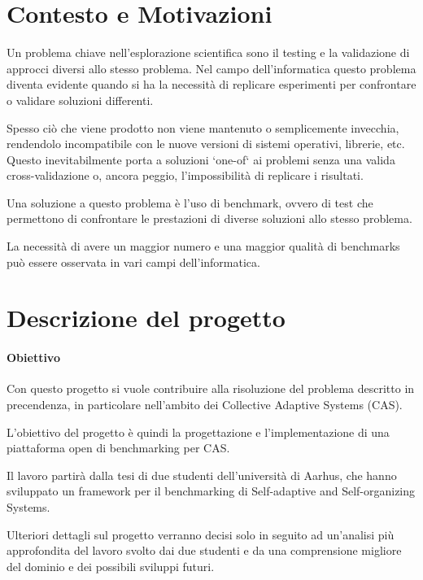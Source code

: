 \documentclass[12pt, a4paper]{article}
\begin{document}


\section{Contesto e Motivazioni} \label{sec:context}

Un problema chiave nell'esplorazione scientifica sono il testing e la validazione di approcci diversi allo stesso 
problema.
Nel campo dell'informatica questo problema diventa evidente quando si ha la necessità di replicare esperimenti
per confrontare o validare soluzioni differenti.

Spesso ciò che viene prodotto non viene mantenuto o semplicemente invecchia, rendendolo incompatibile con le nuove 
versioni di sistemi operativi, librerie, etc.
Questo inevitabilmente porta a soluzioni `one-of` ai problemi senza una valida cross-validazione o, ancora peggio,
l'impossibilità di replicare i risultati.

Una soluzione a questo problema è l'uso di benchmark, ovvero di test che permettono di confrontare le prestazioni di
diverse soluzioni allo stesso problema.

La necessità di avere un maggior numero e una maggior qualità di benchmarks può essere osservata in vari campi 
dell'informatica.

\section{Descrizione del progetto}

\paragraph{Obiettivo}

Con questo progetto si vuole contribuire alla risoluzione del problema descritto in precendenza, in particolare 
nell'ambito dei Collective Adaptive Systems (CAS).

L'obiettivo del progetto è quindi la progettazione e l'implementazione di una piattaforma open di benchmarking per 
CAS.

Il lavoro partirà dalla tesi di due studenti dell'università di Aarhus, che hanno sviluppato un framework per il 
benchmarking di Self-adaptive and Self-organizing Systems.

Ulteriori dettagli sul progetto verranno decisi solo in seguito ad un'analisi più approfondita del lavoro svolto dai 
due studenti e da una comprensione migliore del dominio e dei possibili sviluppi futuri.
\end{document}
